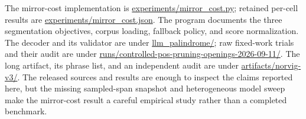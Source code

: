 \documentclass[11pt]{article}
\begin{document}
The mirror-cost implementation is
\url{experiments/mirror_cost.py}; retained per-cell results are
\url{experiments/mirror_cost.json}. The program documents the three
segmentation objectives, corpus loading, fallback policy, and score
normalization. The decoder and its validator are under
\url{llm_palindrome/}; raw fixed-work trials and their audit are under
\url{runs/controlled-pos-pruning-openings-2026-09-11/}. The long artifact, its
phrase list, and an independent audit are under \url{artifacts/norvig-v3/}.
The released sources and results are enough to inspect the claims reported
here, but the missing sampled-span snapshot and heterogeneous model sweep make
the mirror-cost result a careful empirical study rather than a completed
benchmark.
\end{document}
